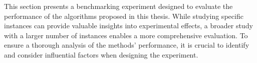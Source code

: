 	
		This section presents a benchmarking experiment designed to evaluate the performance of the algorithms proposed in this thesis. While studying specific instances can provide valuable insights into experimental effects, a broader study with a larger number of instances enables a more comprehensive evaluation. To ensure a thorough analysis of the methods' performance, it is crucial to identify and consider influential factors when designing the experiment.
		

